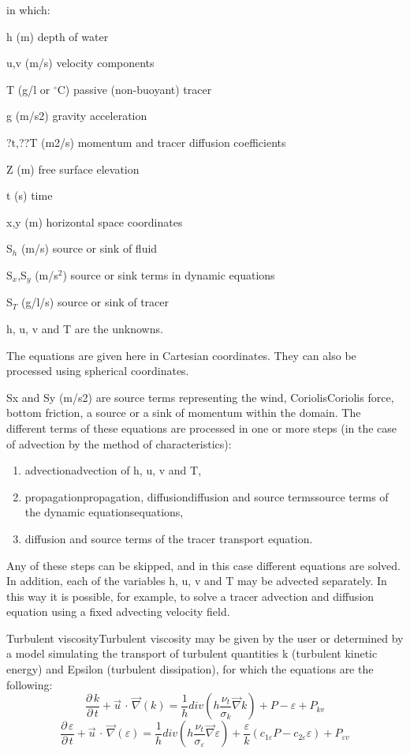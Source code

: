 \documentclass{article} %
\begin{document}
 in which:

 h (m)  depth of water

 u,v (m/s)  velocity components

 T (g/l or ${}^\circ$C) passive (non-buoyant) tracer

 g (m/s2)  gravity acceleration

 ?t,??T (m2/s)  momentum and tracer diffusion coefficients

 Z (m)  free surface elevation

 t (s)  time

 x,y (m)  horizontal space coordinates

 S${}_{h}$ (m/s)  source or sink of fluid

 S${}_{x}$,S${}_{y}$ (m/s${}^{2}$)  source or sink terms in dynamic equations

 S${}_{T}$ (g/l/s)  source or sink of tracer



 h, u, v and T are the unknowns.

 The equations are given here in Cartesian coordinates. They can also be processed using spherical coordinates.

  Sx and Sy (m/s2) are source terms representing the wind, CoriolisCoriolis force, bottom friction, a source or a sink of momentum within the domain. The different terms of these equations are processed in one or more steps (in the case of advection by the method of characteristics):

\begin{enumerate}
\item  advectionadvection of h, u, v and T,

\item  propagationpropagation, diffusiondiffusion and source termssource terms of the dynamic equationsequations,

\item  diffusion and source terms of the tracer transport equation.
\end{enumerate}

 Any of these steps can be skipped, and in this case different equations are solved. In addition, each of the variables h, u, v and T may be advected separately. In this way it is possible, for example, to solve a tracer advection and diffusion equation using a fixed advecting velocity field.

 Turbulent viscosityTurbulent viscosity may be given by the user or determined by a model simulating the transport of turbulent quantities k (turbulent kinetic energy) and Epsilon (turbulent dissipation), for which the equations are the following:
\[\frac{\partial \, k}{\partial \, t} +\vec{u}\, \cdot \, \vec{\nabla }(k)=\frac{1}{h} div(h\frac{\nu _{t} }{\sigma _{k} } \vec{\nabla }k)+P-\varepsilon +P_{kv} \]
\[\frac{\partial \, \varepsilon }{\partial \, t} +\vec{u}\, \cdot \, \vec{\nabla }(\varepsilon )=\frac{1}{h} div(h\frac{\nu _{t} }{\sigma _{\varepsilon } } \vec{\nabla }\varepsilon )+\frac{\varepsilon }{k} (c_{1\varepsilon } P-c_{2\varepsilon } \varepsilon )+P_{\varepsilon v} \]
\end{document}
